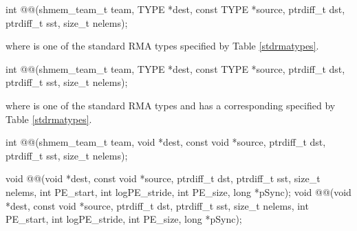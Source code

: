 
\begin{apidefinition}

\begin{C11synopsis}
int @@(shmem_team_t team, TYPE *dest, const TYPE *source, ptrdiff_t dst, ptrdiff_t sst, size_t nelems);
\end{C11synopsis}
where \TYPE{} is one of the standard \ac{RMA} types specified by Table \ref{stdrmatypes}.

\begin{Csynopsis}
\end{Csynopsis}
\begin{CsynopsisCol}
int @@(shmem_team_t team, TYPE *dest, const TYPE *source, ptrdiff_t dst, ptrdiff_t sst, size_t nelems);
\end{CsynopsisCol}
where \TYPE{} is one of the standard \ac{RMA} types and has a corresponding \TYPENAME{} specified by Table \ref{stdrmatypes}.

\begin{CsynopsisCol}
int @@(shmem_team_t team, void *dest, const void *source, ptrdiff_t dst, ptrdiff_t sst, size_t nelems);
\end{CsynopsisCol}

\begin{DeprecateBlock}
\begin{CsynopsisCol}
void @@(void *dest, const void *source, ptrdiff_t dst, ptrdiff_t sst, size_t nelems, int PE_start, int logPE_stride, int PE_size, long *pSync);
void @@(void *dest, const void *source, ptrdiff_t dst, ptrdiff_t sst, size_t nelems, int PE_start, int logPE_stride, int PE_size, long *pSync);
\end{CsynopsisCol}
\end{DeprecateBlock}

\begin{apiarguments}

%


\end{apiarguments}
\end{apidefinition}
